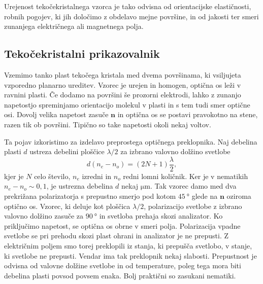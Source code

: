 Urejenost tekočekristalnega vzorca je tako odvisna od orientacijske
elastičnosti, robnih pogojev, ki jih določimo z obdelavo mejne
površine, in od jakosti ter smeri zunanjega električnega ali magnetnega polja.

\subsection*{Tekočekristalni prikazovalnik}
Vzemimo tanko plast tekočega kristala med dvema površinama, ki vsiljujeta
vzporedno planarno ureditev. Vzorec je urejen in homogen, optična os leži v ravnini 
plasti. Če dodamo na površini še prozorni elektrodi, lahko
z zunanjo napetostjo spreminjamo orientacijo molekul v plasti in s tem tudi 
smer optične osi. Dovolj velika napetost zasuče $\mathbf{n}$ in optična os
se postavi pravokotno na stene, razen tik ob površini. Tipično so take napetosti okoli 
nekaj voltov.

Ta pojav izkoristimo za izdelavo preprostega optičnega preklopnika. 
Naj debelina plasti $d$ ustreza debelini ploščice $\lambda/2$ 
za izbrano valovno dolžino svetlobe 
\begin{equation}
d(n_{e}-n_{o})=(2N+1)\frac{\lambda}{2},
\label{7.57}
\end{equation}
kjer je $N$ celo število, $n_e$ izredni in $n_o$ redni 
lomni količnik. Ker je v nematikih $n_{e}-n_{o}\sim0,1$, 
je ustrezna debelina $d$ nekaj $\si{\micro\metre}$. Tak vzorec damo med dva prekrižana 
polarizatorja s prepustno smerjo pod kotom $45~\si{\degree}$ glede na $\mathbf{n}$
oziroma optično os. Vzorec, ki deluje kot ploščica $\lambda/2$, 
polarizacijo svetlobe z izbrano valovno dolžino zasuče za $90~\si{\degree}$ in 
svetloba prehaja skozi analizator. Ko
priključimo napetost, se optična os obrne v smeri polja. Polarizacija vpadne 
svetlobe se pri prehodu skozi plast ohrani in 
analizator je ne prepusti. Z električnim poljem smo torej preklopili iz
stanja, ki prepušča svetlobo, v stanje, ki svetlobe ne prepusti.
Vendar ima tak preklopnik nekaj slabosti. Prepustnost je odvisna
od valovne dolžine svetlobe in od temperature, poleg tega mora biti debelina 
plasti povsod povsem enaka. Bolj praktični so zasukani nematiki. 

